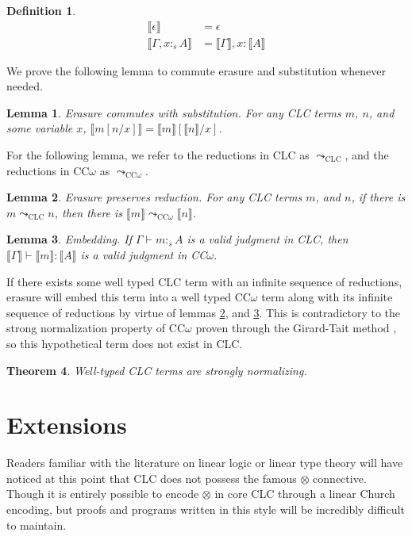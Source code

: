 \documentclass[sigplan,screen]{acmart}
\newtheorem{theorem}{Theorem}[section]
\newtheorem{lemma}[theorem]{Lemma}
\theoremstyle{definition}
\newtheorem{definition}{Definition}[section]
\newcommand{\stype}[1]{:_#1}
\newcommand{\pstep}{\leadsto}
\newcommand{\erase}[1]{\llbracket #1 \rrbracket}
\begin{document}
  \begin{definition}
    \begin{align*}
      \erase{\epsilon} &= \epsilon \\
      \erase{\Gamma, x \stype{s} A} &= \erase{\Gamma}, x : \erase{A}
    \end{align*}
  \end{definition}

  We prove the following lemma to commute erasure and substitution whenever needed.
  \begin{lemma} 
    Erasure commutes with substitution. For any CLC terms $m$, $n$, and some variable $x$, $\erase{m[n/x]} = \erase{m}[\erase{n}/x]$. 
  \end{lemma}

  For the following lemma, we refer to the reductions in CLC as $\pstep_{\scriptscriptstyle \text{CLC}}$, and the reductions in CC$\omega$ as $\pstep_{\scriptscriptstyle \text{CC$\omega$}}$.
  \begin{lemma} \label{preserve} 
    Erasure preserves reduction. For any CLC terms $m$, and $n$, if there is $m \pstep_{\scriptscriptstyle \text{CLC}} n$, then there is $\erase{m} \pstep_{\scriptscriptstyle \text{CC$\omega$}} \erase{n}$.
  \end{lemma}

  \begin{lemma} \label{embedding} 
    Embedding. If $\Gamma \vdash m \stype{s} A$ is a valid judgment in CLC, then $\erase{\Gamma} \vdash \erase{m} : \erase{A}$ is a valid judgment in CC$\omega$.
  \end{lemma}

  If there exists some well typed CLC term with an infinite sequence of reductions, erasure will embed this term into a well typed CC$\omega$ term along with its infinite sequence of reductions by virtue of lemmas \ref{preserve}, and \ref{embedding}. This is contradictory to the strong normalization property of CC$\omega$ proven through the Girard-Tait method \cite{ecc}, so this hypothetical term does not exist in CLC.

  \begin{theorem}
    Well-typed CLC terms are strongly normalizing.
  \end{theorem}

  \section{Extensions}
  Readers familiar with the literature on linear logic or linear type theory will have noticed at this point that CLC does not possess the famous $\otimes$ connective. Though it is entirely possible to encode $\otimes$ in core CLC through a linear Church encoding, but proofs and programs written in this style will be incredibly difficult to maintain. 
\end{document}
